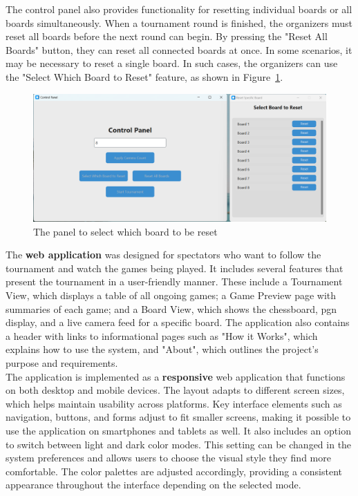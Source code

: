 The control panel also provides functionality for resetting individual boards or all boards simultaneously. When a tournament round is finished, the organizers must reset all boards before the next round can begin. By pressing the "Reset All Boards" button, they can reset all connected boards at once. In some scenarios, it may be necessary to reset a single board. In such cases, the organizers can use the "Select Which Board to Reset" feature, as shown in Figure~\ref{fig:control-panel-reset-boards}. \\

\begin{figure}[h!] \centering \includegraphics[width=0.75\linewidth]{figures/results/frontend/control-panel/reset-boards.png} \caption[Panel to reset a single board]{The panel to select which board to be reset}\label{fig:control-panel-reset-boards} \end{figure}

The \textbf{web application} was designed for spectators  who want to follow the tournament and watch the games being played. It includes several features that present the tournament in a user-friendly manner. These include a Tournament View, which displays a table of all ongoing games; a Game Preview page with summaries of each game; and a Board View, which shows the chessboard, \gls{pgn} display, and a live camera feed for a specific board. The application also contains a header with links to informational pages such as "How it Works", which explains how to use the system, and "About", which outlines the project’s purpose and requirements. \\

The application is implemented as a \textbf{responsive} web application that functions on both desktop and mobile devices. The layout adapts to different screen sizes, which helps maintain usability across platforms. Key interface elements such as navigation, buttons, and forms adjust to fit smaller screens, making it possible to use the application on smartphones and tablets as well. It also includes an option to switch between light and dark color modes. This setting can be changed in the system preferences and allows users to choose the visual style they find more comfortable. The color palettes are adjusted accordingly, providing a consistent appearance throughout the interface depending on the selected mode. \\

